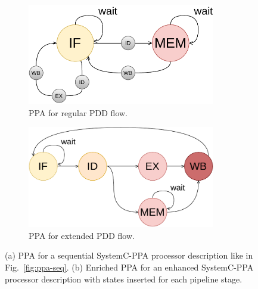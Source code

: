 \begin{figure}[htb!]
\centering
\begin{subfigure}[b]{0.45\textwidth}
  \centering
	\includegraphics[width=0.9\textwidth]{images/PPA_old.pdf}
	\caption{PPA for regular PDD flow.}
	\label{subfig:ppa-seq}
\end{subfigure}
\hfill
\begin{subfigure}[b]{0.45\textwidth}
  \centering
	\includegraphics[width=0.9\textwidth]{images/PPA_new.pdf}
	\caption{PPA for extended PDD flow.}
	\label{subfig:ppa-pipe-processor}
\end{subfigure}
\caption{(a) PPA for a sequential SystemC-PPA processor description like in Fig.~\ref{fig:ppa-seq}. (b) Enriched PPA for an enhanced SystemC-PPA processor description with states inserted for each pipeline stage.}
\label{fig:ppa-old-and-new}
\end{figure}

